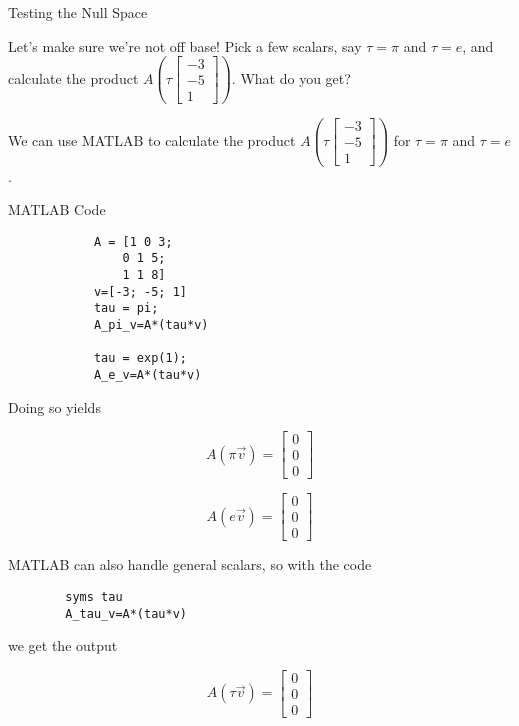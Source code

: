 \documentclass{ximera}
\begin{document}
\begin{problem}{Testing the Null Space}

Let's make sure we're not off base! Pick a few scalars, say $\tau=\pi$ and $\tau=e$, and calculate the product $A\left(\tau\begin{bmatrix} -3 \\ -5 \\ 1 \end{bmatrix}\right)$. What do you get?

\begin{solution}

    We can use MATLAB to calculate the product $A\left(\tau\begin{bmatrix} -3 \\ -5 \\ 1 \end{bmatrix}\right)$ for $\tau=\pi$ and $\tau=e$.

    \begin{hint}{MATLAB Code}
        \begin{verbatim}
            A = [1 0 3; 
                0 1 5; 
                1 1 8]
            v=[-3; -5; 1]
            tau = pi;
            A_pi_v=A*(tau*v)
            
            tau = exp(1);
            A_e_v=A*(tau*v)
        \end{verbatim}
    \end{hint}

    Doing so yields

    $$A\left(\pi\vec{v}\right)=\begin{bmatrix} 0 \\ 0 \\ 0 \end{bmatrix}$$

    $$A\left(e\vec{v}\right)=\begin{bmatrix} 0 \\ 0 \\ 0 \end{bmatrix}$$

    MATLAB can also handle general scalars, so with the code


    \begin{verbatim}
        syms tau
        A_tau_v=A*(tau*v)
    \end{verbatim}

    we get the output

    $$A\left(\tau\vec{v}\right)=\begin{bmatrix} 0 \\ 0 \\ 0 \end{bmatrix}$$
    

\end{solution}

\end{problem}
\end{document}
